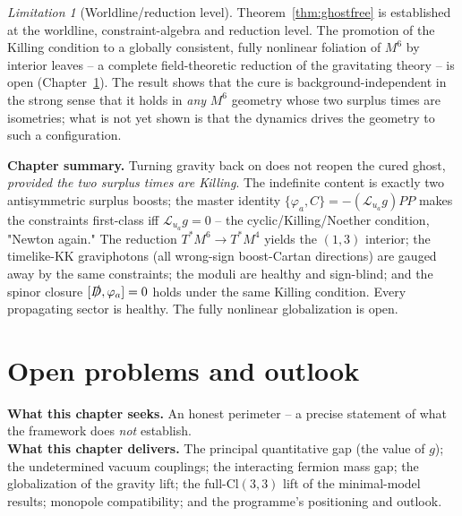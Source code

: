 \documentclass[11pt,oneside]{book}
\newcommand{\Cl}{\mathrm{Cl}}                     %
\newcommand{\Lie}{\mathcal{L}}
\newcommand{\Dirac}{\slashed{D}}
\theoremstyle{plain}
\theoremstyle{definition}
\theoremstyle{remark}
\newtheorem{limitation}[theorem]{Limitation}
\begin{document}
\begin{limitation}[Worldline/reduction level]
\label{lim:lift}
Theorem~\ref{thm:ghostfree} is established at the worldline, constraint-algebra and
reduction level. The promotion of the Killing condition to a globally consistent,
fully nonlinear foliation of $M^6$ by interior leaves -- a complete field-theoretic
reduction of the gravitating theory -- is open (Chapter~\ref{ch:open}). The result
shows that the cure is background-independent in the strong sense that it holds in
\emph{any} $M^6$ geometry whose two surplus times are isometries; what is not yet
shown is that the dynamics drives the geometry to such a configuration.
\end{limitation}

\begin{leavesbox}
\textbf{Chapter summary.} Turning gravity back on does not reopen the cured ghost,
\emph{provided the two surplus times are Killing}. The indefinite content is exactly
two antisymmetric surplus boosts; the master identity
$\{\varphi_a,C\}=-(\Lie_{u_a}g)PP$ makes the constraints first-class iff
$\Lie_{u_a}g=0$ -- the cyclic/Killing/Noether condition, "Newton again." The
reduction $T^*M^6\to T^*M^4$ yields the $(1,3)$ interior; the timelike-KK
graviphotons (all wrong-sign boost-Cartan directions) are gauged away by the same
constraints; the moduli are healthy and sign-blind; and the spinor closure
$[\Dirac,\varphi_a]=0$ holds under the same Killing condition. Every propagating
sector is healthy. The fully nonlinear globalization is open.
\end{leavesbox}

\chapter{Open problems and outlook}
\label{ch:open}

\begin{leavesbox}
\textbf{What this chapter seeks.} An honest perimeter -- a precise statement of what
the framework does \emph{not} establish.\\[2pt]
\textbf{What this chapter delivers.} The principal quantitative gap (the value of
$g$); the undetermined vacuum couplings; the interacting fermion mass gap; the
globalization of the gravity lift; the full-$\Cl(3,3)$ lift of the minimal-model
results; monopole compatibility; and the programme's positioning and outlook.
\end{leavesbox}
\end{document}
